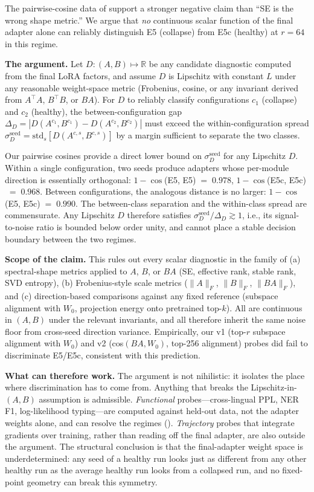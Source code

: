 \documentclass[11pt]{article}
\begin{document}
The pairwise-cosine data of  support a stronger negative claim than ``SE is the wrong shape metric.'' We argue that \emph{no} continuous scalar function of the final adapter alone can reliably distinguish E5 (collapse) from E5c (healthy) at $r{=}64$ in this regime.

\textbf{The argument.} Let $D : (A, B) \mapsto \mathbb{R}$ be any candidate diagnostic computed from the final LoRA factors, and assume $D$ is Lipschitz with constant $L$ under any reasonable weight-space metric (Frobenius, cosine, or any invariant derived from $A^{\top}A$, $B^{\top}B$, or $BA$). For $D$ to reliably classify configurations $c_1$ (collapse) and $c_2$ (healthy), the between-configuration gap $\Delta_{D} = |D(A^{c_1}, B^{c_1}) - D(A^{c_2}, B^{c_2})|$ must exceed the within-configuration spread $\sigma_{D}^{\text{seed}} = \mathrm{std}_{s}[D(A^{c, s}, B^{c, s})]$ by a margin sufficient to separate the two classes.

Our pairwise cosines provide a direct lower bound on $\sigma_{D}^{\text{seed}}$ for any Lipschitz $D$. Within a single configuration, two seeds produce adapters whose per-module direction is essentially orthogonal: $1 - \cos$(E5, E5)$ \;=\; 0.978$, $1 - \cos$(E5c, E5c)$ \;=\; 0.968$. Between configurations, the analogous distance is no larger: $1 - \cos$(E5, E5c)$ \;=\; 0.990$. The between-class separation and the within-class spread are commensurate. Any Lipschitz $D$ therefore satisfies $\sigma_{D}^{\text{seed}}/\Delta_{D} \gtrsim 1$, i.e., its signal-to-noise ratio is bounded below order unity, and cannot place a stable decision boundary between the two regimes.

\textbf{Scope of the claim.} This rules out every scalar diagnostic in the family of (a) spectral-shape metrics applied to $A$, $B$, or $BA$ (SE, effective rank, stable rank, SVD entropy), (b) Frobenius-style scale metrics ($\|A\|_F$, $\|B\|_F$, $\|BA\|_F$), and (c) direction-based comparisons against any fixed reference (subspace alignment with $W_0$, projection energy onto pretrained top-$k$). All are continuous in $(A, B)$ under the relevant invariants, and all therefore inherit the same noise floor from cross-seed direction variance. Empirically, our v1 (top-$r$ subspace alignment with $W_0$) and v2 (cos$(BA, W_0)$, top-256 alignment) probes did fail to discriminate E5/E5c, consistent with this prediction.

\textbf{What can therefore work.} The argument is not nihilistic: it isolates the place where discrimination has to come from. Anything that breaks the Lipschitz-in-$(A, B)$ assumption is admissible. \emph{Functional} probes---cross-lingual PPL, NER F1, log-likelihood typing---are computed against held-out data, not the adapter weights alone, and can resolve the regimes (). \emph{Trajectory} probes that integrate gradients over training, rather than reading off the final adapter, are also outside the argument. The structural conclusion is that the final-adapter weight space is underdetermined: any seed of a healthy run looks just as different from any other healthy run as the average healthy run looks from a collapsed run, and no fixed-point geometry can break this symmetry.
\end{document}
